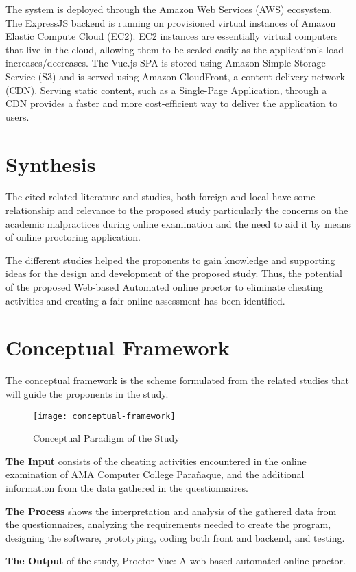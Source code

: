 The system is deployed through the Amazon Web Services (AWS) ecosystem.
The ExpressJS backend is running on provisioned virtual instances of Amazon Elastic Compute Cloud (EC2).
EC2 instances are essentially virtual computers that live in the cloud, allowing them to be scaled easily as the application's load increases/decreases.
The Vue.js SPA is stored using Amazon Simple Storage Service (S3) and is served using Amazon CloudFront, a content delivery network (CDN).
Serving static content, such as a Single-Page Application, through a CDN provides a faster and more cost-efficient way to deliver the application to users.

\section{Synthesis}

The cited related literature and studies, both foreign and local have some relationship and relevance to the proposed study particularly the concerns on the academic malpractices during online examination and the need to aid it by means of online proctoring application.

The different studies helped the proponents to gain knowledge and supporting ideas for the design and development of the proposed study.
Thus, the potential of the proposed Web-based Automated online proctor to eliminate cheating activities and creating a fair online assessment has been identified.

\section{Conceptual Framework}

The conceptual framework is the scheme formulated from the related studies that will guide the proponents in the study.

\pagebreak

\begin{figure}[h!]
   \begin{center}
      \texttt{[image: conceptual-framework]}
      \caption{Conceptual Paradigm of the Study}
   \end{center}
\end{figure}

\textbf{The Input} consists of the cheating activities encountered in the online examination of AMA Computer College Parañaque, and the additional information from the data gathered in the questionnaires.

\textbf{The Process} shows the interpretation and analysis of the gathered data from the questionnaires, analyzing the requirements needed to create the program, designing the software, prototyping, coding both front and backend, and testing.

\textbf{The Output} of the study, Proctor Vue: A web-based automated online proctor.

